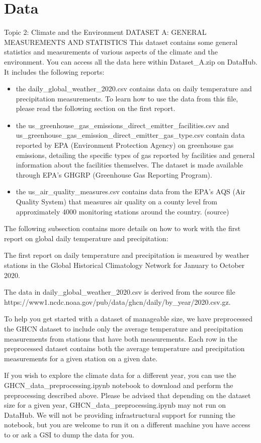 \section{Data}
Topic 2: Climate and the Environment
DATASET A: GENERAL MEASUREMENTS AND STATISTICS
This dataset contains some general statistics and measurements of various aspects of the climate and the environment. You can access all the data here within Dataset\_A.zip on DataHub. It includes the following reports:
\begin{itemize}
    \item the daily\_global\_weather\_2020.csv contains data on daily temperature and precipitation measurements. To learn how to use the data from this file, please read the following section on the first report.
    \item the us\_greenhouse\_gas\_emissions\_direct\_emitter\_facilities.csv and us\_greenhouse\_gas\_emission\_direct\_emitter\_gas\_type.csv contain data reported by EPA (Environment Protection Agency) on greenhouse gas emissions, detailing the specific types of gas reported by facilities and general information about the facilities themselves. The dataset is made available through EPA’s GHGRP (Greenhouse Gas Reporting Program).
    \item the us\_air\_quality\_measures.csv contains data from the EPA’s AQS (Air Quality System) that measures air quality on a county level from approximately 4000 monitoring stations around the country. (source)
\end{itemize}


The following subsection contains more details on how to work with the first report on global daily temperature and precipitation:

The first report on daily temperature and precipitation is measured by weather stations in the Global Historical Climatology Network for January to October 2020.

The data in daily\_global\_weather\_2020.csv is derived from the source file  https://www1.ncdc.noaa.gov/pub/data/ghcn/daily/by\_year/2020.csv.gz.

To help you get started with a dataset of manageable size, we have preprocessed the GHCN dataset to include only the average temperature and precipitation measurements from stations that have both measurements. Each row in the preprocessed dataset contains both the average temperature and precipitation measurements for a given station on a given date.

If you wish to explore the climate data for a different year, you can use the GHCN\_data\_preprocessing.ipynb notebook to download and perform the preprocessing described above. Please be advised that depending on the dataset size for a given year, GHCN\_data\_preprocessing.ipynb may not run on DataHub. We will not be providing infrastructural support for running the notebook, but you are welcome to run it on a different machine you have access to or ask a GSI to dump the data for you.

